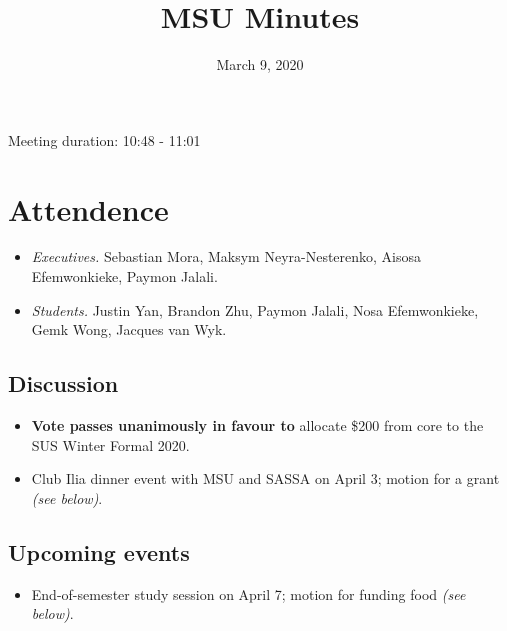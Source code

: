 \documentclass[12pt]{article}
\title{MSU Minutes}
\date{March 9, 2020}
\begin{document}
\maketitle

Meeting duration: 10:48 - 11:01

\section*{Attendence}
\begin{itemize}
\item \textit{Executives.} Sebastian Mora, Maksym Neyra-Nesterenko, Aisosa Efemwonkieke, Paymon Jalali.
\item \textit{Students.} Justin Yan, Brandon Zhu, Paymon Jalali, Nosa Efemwonkieke, Gemk Wong, Jacques van Wyk.
\end{itemize}

\subsection*{Discussion}
\begin{itemize}
\item \textbf{Vote passes unanimously in favour to} allocate \$200 from core to the SUS Winter Formal 2020.
\item Club Ilia dinner event with MSU and SASSA on April 3; motion for a grant \textit{(see below)}.
\end{itemize}

\subsection*{Upcoming events}
\begin{itemize}
\item End-of-semester study session on April 7; motion for funding food \textit{(see below)}.
\end{itemize}
\end{document}
